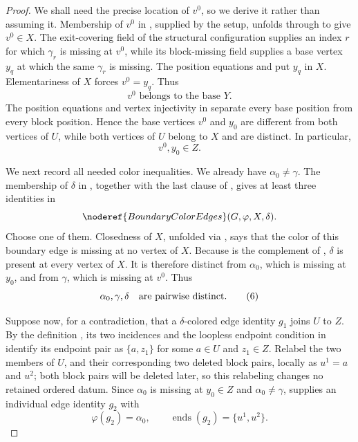\begin{proof}
We shall need the precise location of $v^0$, so we derive it rather than
assuming it.  Membership of $v^0$ in
, supplied by the setup, unfolds through
 to give $v^0\in X$.  The exit-covering field
of the structural configuration supplies an index $r$ for which
$\gamma_r$ is missing at $v^0$, while its block-missing field supplies a
base vertex $y_q$ at which the same $\gamma_r$ is missing.  The position
equations and  put $y_q$ in $X$.
Elementariness of $X$ forces $v^0=y_q$.  Thus
\[
 v^0\text{ belongs to the base }Y.                             \tag{4}
\]
The position equations and vertex injectivity in
 separate every base position from every block
position.  Hence the base vertices $v^0$ and $y_0$ are different from
both vertices of $U$, while both vertices of $U$ belong to $X$ and are
distinct.  In particular,
\[
 v^0,y_0\in Z.                                                 \tag{5}
\]

We next record all needed color inequalities.  We already have
$\alpha_0\ne\gamma$.  The membership of $\delta$ in
, together with the last clause of
, gives at least three
identities in
\[
 \noderef{BoundaryColorEdges}(G,\varphi,X,\delta).
\]
Choose one of them.  Closedness of $X$, unfolded via
, says that the color of this boundary
edge is missing at no vertex of $X$.  Because
 is the complement of
, $\delta$ is present at every vertex of $X$.
It is therefore distinct from $\alpha_0$, which is missing at $y_0$, and
from $\gamma$, which is missing at $v^0$.  Thus
\[
 \alpha_0,\gamma,\delta\quad\hbox{are pairwise distinct}.       \tag{6}
\]

Suppose now, for a contradiction, that a $\delta$-colored edge identity
$g_1$ joins $U$ to $Z$.  By the definition , its two
incidences and the loopless endpoint condition in
 identify its endpoint pair as
$\{a,z_1\}$ for some $a\in U$ and $z_1\in Z$.  Relabel the two members
of $U$, and their corresponding two deleted block pairs, locally as
$u^1=a$ and $u^2$; both block pairs will be deleted later, so this
relabeling changes no retained ordered datum.  Since
$\alpha_0$ is missing at $y_0\in Z$ and $\alpha_0\ne\gamma$,
 supplies an individual edge
identity $g_2$ with
\[
 \varphi(g_2)=\alpha_0,\qquad
 \operatorname{ends}(g_2)=\{u^1,u^2\}.                         \tag{7}
\]


\end{proof}
